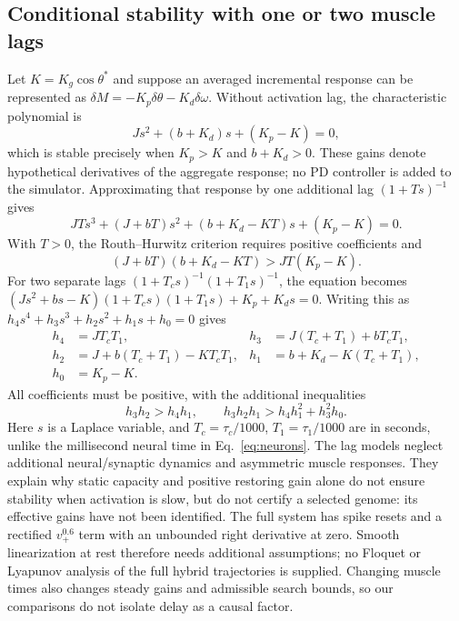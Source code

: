 \documentclass{styles/svproc}
\begin{document}
\subsection{Conditional stability with one or two muscle lags}
Let $K=K_g\cos\theta^*$ and suppose an averaged incremental response can be represented as $\delta M=-K_p\delta\theta-K_d\delta\omega$. Without activation lag, the characteristic polynomial is
\begin{equation}
 Js^2+(b+K_d)s+(K_p-K)=0,
 \label{eq:zerolag}
\end{equation}
which is stable precisely when $K_p>K$ and $b+K_d>0$. These gains denote hypothetical derivatives of the aggregate response; no PD controller is added to the simulator. Approximating that response by one additional lag $(1+Ts)^{-1}$ gives
\begin{equation}
 JT s^3+(J+bT)s^2+(b+K_d-KT)s+(K_p-K)=0.
 \label{eq:onelag}
\end{equation}
With $T>0$, the Routh--Hurwitz criterion requires positive coefficients and
\begin{equation}
 (J+bT)(b+K_d-KT)>JT(K_p-K).
 \label{eq:onelagRH}
\end{equation}
For two separate lags $(1+T_cs)^{-1}(1+T_1s)^{-1}$, the equation becomes $(Js^2+bs-K)(1+T_cs)(1+T_1s)+K_p+K_ds=0$. Writing this as $h_4s^4+h_3s^3+h_2s^2+h_1s+h_0=0$ gives
\begin{align}
 h_4&=JT_cT_1,& h_3&=J(T_c+T_1)+bT_cT_1,\nonumber\\
 h_2&=J+b(T_c+T_1)-KT_cT_1,&
 h_1&=b+K_d-K(T_c+T_1),\nonumber\\
 h_0&=K_p-K.&&
 \label{eq:twolag}
\end{align}
All coefficients must be positive, with the additional inequalities
\begin{equation}
 h_3h_2>h_4h_1,\qquad
 h_3h_2h_1>h_4h_1^2+h_3^2h_0.
 \label{eq:twolagRH}
\end{equation}
Here $s$ is a Laplace variable, and $T_c=\tau_c/1000$, $T_1=\tau_1/1000$ are in seconds, unlike the millisecond neural time in Eq.~\ref{eq:neurons}. The lag models neglect additional neural/synaptic dynamics and asymmetric muscle responses. They explain why static capacity and positive restoring gain alone do not ensure stability when activation is slow, but do not certify a selected genome: its effective gains have not been identified. The full system has spike resets and a rectified $v_+^{0.6}$ term with an unbounded right derivative at zero. Smooth linearization at rest therefore needs additional assumptions; no Floquet or Lyapunov analysis of the full hybrid trajectories is supplied. Changing muscle times also changes steady gains and admissible search bounds, so our comparisons do not isolate delay as a causal factor.
\end{document}
